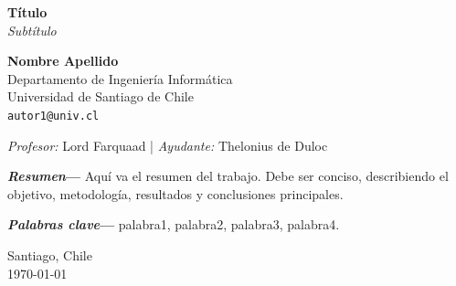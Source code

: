\documentclass[10pt, a4paper]{article}
\begin{document}
\begin{center}
  \thispagestyle{fancy} %
  \centering
  \vspace{1cm}

  {\LARGE \textbf{Título}\\[0.4em]
  \large \textit{Subtítulo}}

  \vspace{1.2cm}

  \textbf{Nombre Apellido}\\
  Departamento de Ingeniería Informática\\
  Universidad de Santiago de Chile\\
  \texttt{autor1@univ.cl}
  
  \vspace{0.8em}
  {\small \textit{Profesor:} Lord Farquaad \quad | \quad \textit{Ayudante:} Thelonius de Duloc}
  \vspace{0.8em}

  \begin{minipage}{0.85\textwidth}
    \textbf{\textit{Resumen}—} Aquí va el resumen del trabajo. 
    Debe ser conciso, describiendo el objetivo, metodología, resultados y conclusiones principales.
    
    \vspace{0.8em}
    \textbf{\textit{Palabras clave}—} palabra1, palabra2, palabra3, palabra4.
  \end{minipage}

  \vspace{0.6cm}
  {\small Santiago, Chile \\ \today}
\end{center}
\end{document}
